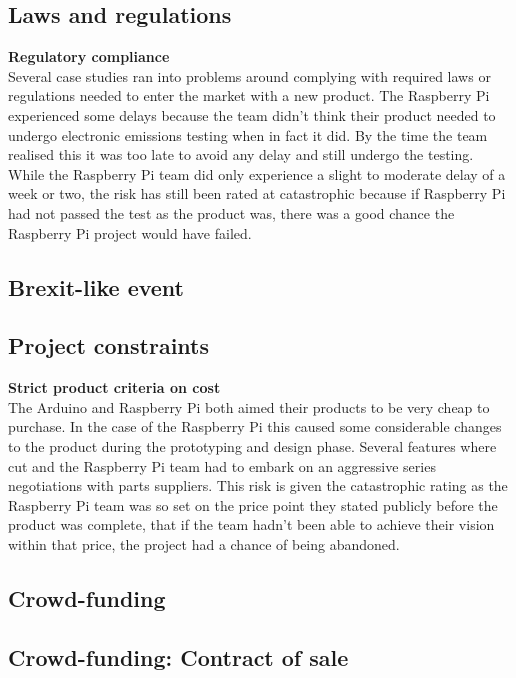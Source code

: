 \subsection{Laws and regulations}
\textbf{Regulatory compliance}\\
Several case studies ran into problems around complying with required laws or regulations needed to enter the market with a new product. The Raspberry Pi experienced some delays because the team didn't think their product needed to undergo electronic emissions testing when in fact it did. By the time the team realised this it was too late to avoid any delay and still undergo the testing. While the Raspberry Pi team did only experience a slight to moderate delay of a week or two, the risk has still been rated at catastrophic because if Raspberry Pi had not passed the test as the product was, there was a good chance the Raspberry Pi project would have failed.\\

\subsection{Brexit-like event}



\subsection{Project constraints}
\textbf{Strict product criteria on cost}\\
The Arduino and Raspberry Pi both aimed their products to be very cheap to purchase. In the case of the Raspberry Pi this caused some considerable changes to the product during the prototyping and design phase. Several features where cut and the Raspberry Pi team had to embark on an aggressive series negotiations with parts suppliers. This risk is given the catastrophic rating as the Raspberry Pi team was so set on the price point they stated publicly before the product was complete, that if the team hadn't been able to achieve their vision within that price, the project had a chance of being abandoned.\\
  
\subsection{Crowd-funding}

\subsection{Crowd-funding: Contract of sale}

